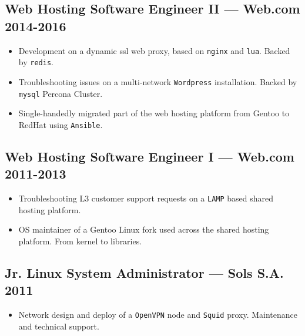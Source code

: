 \documentclass[11pt]{article}
\begin{document}
\subsection{Web Hosting Software Engineer II --- Web.com \hfill 2014-2016}
\begin{itemize}
\item Development on a dynamic ssl web proxy, based on \texttt{nginx} and \texttt{lua}. Backed by \texttt{redis}.
\item Troubleshooting issues on a multi-network \texttt{Wordpress} installation. Backed by \texttt{mysql} Percona Cluster.
\item Single-handedly migrated part of the web hosting platform from Gentoo to RedHat using \texttt{Ansible}.
\end{itemize}

\subsection{Web Hosting Software Engineer I --- Web.com \hfill 2011-2013}
\begin{itemize}
\item Troubleshooting L3 customer support requests on a \texttt{LAMP} based shared hosting platform.
\item OS maintainer of a Gentoo Linux fork used across the shared hosting platform. From kernel to libraries.
\end{itemize}

\subsection{Jr. Linux System Administrator --- Sols S.A. \hfill 2011}
\begin{itemize}
\item Network design and deploy of a \texttt{OpenVPN} node and \texttt{Squid} proxy. Maintenance and technical support.
\end{itemize}
\end{document}
